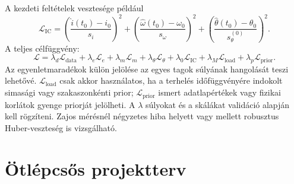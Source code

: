 \documentclass[11pt,a4paper]{article}
\begin{document}
A kezdeti feltételek vesztesége például
\begin{equation}
  \mathcal{L}_{\mathrm{IC}}=
  \left(\frac{\hat{i}(t_0)-i_0}{s_i}\right)^2+
  \left(\frac{\hat{\omega}(t_0)-\omega_0}{s_\omega}\right)^2+
  \left(\frac{\hat{\theta}(t_0)-\theta_0}{s_\theta^{(0)}}\right)^2.
\end{equation}
A teljes célfüggvény:
\begin{equation}
\boxed{
  \mathcal{L}=
  \lambda_d\mathcal{L}_{\mathrm{data}}+
  \lambda_e\mathcal{L}_{e}+
  \lambda_m\mathcal{L}_{m}+
  \lambda_{\theta}\mathcal{L}_{\theta}+
  \lambda_0\mathcal{L}_{\mathrm{IC}}+
  \lambda_M\mathcal{L}_{\mathrm{load}}+
  \lambda_p\mathcal{L}_{\mathrm{prior}}.
}
\label{eq:loss}
\end{equation}
Az egyenletmaradékok külön jelölése az egyes tagok súlyának hangolását teszi lehetővé. $\mathcal{L}_{\mathrm{load}}$ csak akkor használatos, ha a terhelés időfüggvényére indokolt simasági vagy szakaszonkénti prior; $\mathcal{L}_{\mathrm{prior}}$ ismert adatlapértékek vagy fizikai korlátok gyenge priorját jelölheti. A $\lambda$ súlyokat és a skálákat validáció alapján kell rögzíteni. Zajos mérésnél négyzetes hiba helyett vagy mellett robusztus Huber-veszteség is vizsgálható.

\section{Ötlépcsős projektterv}
\end{document}
